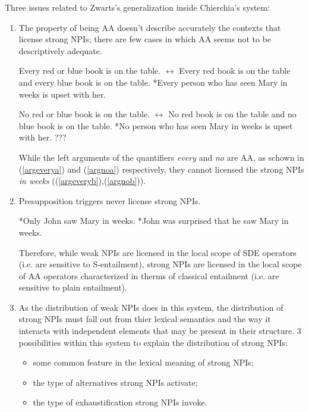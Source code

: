 \documentclass[a4paper,11pt]{article}
\newcommand{\reff}[1]{(\ref{#1})}
\begin{document}
Three issues related to Zwarts's generalization inside Chierchia's system:
\begin{enumerate}
\item The property of being AA doesn't describe accurately the contexts that license strong NPIs; there are few cases in which AA seems not to be descriptively adequate.
\begin{exe}
\ex\label{everyno} \begin{xlist}
\ex\label{argevery} \begin{xlist}
\ex\label{argeverya} Every red or blue book is on the table. $\leftrightarrow$ Every red book is on the table and every blue book is on the table.
\ex\label{argeveryb} *Every person who has seen Mary in weeks is upset with her.
\end{xlist}
\ex\label{argno} \begin{xlist}
\ex\label{argnoa} No red or blue book is on the table. $\leftrightarrow$ No red book is on the table and no blue book is on the table.
\ex\label{argnob} *No person who has seen Mary in weeks is upset with her. ??? 
\end{xlist}
\end{xlist}
\end{exe}
While the left arguments of the quantifiers \textit{every} and \textit{no} are AA, as schown in \reff{argeverya} and \reff{argnoa} respectively, they cannot licensed the strong NPIs \textit{in weeks} (\reff{argeveryb},\reff{argnob}).
\item Presupposition triggers never license strong NPIs.
\begin{exe}
\ex\label{presuptrig} \begin{xlist}
\ex\label{presuptriga} *Only John saw Mary in weeks. 
\ex\label{presuptrigb} *John was surprised that he saw Mary in weeks.
\end{xlist}
\end{exe}
Therefore, while weak NPIs are licensed in the local scope of SDE operators (i.e. are sensitive to S-entailment), strong NPIs are licensed in the local scope of AA operators 
characterized in therms of classical entailment (i.e. are sensitive to plain entailment).
\item As the distribution of weak NPIs does in this system, the distribution of strong NPIs must fall out from thier lexical semantics and the way it interacts with independent elements that may be present in their structure. 3 possibilities within this system to explain the distribution of strong NPIs:
\begin{itemize}
\item some common feature in the lexical meaning of strong NPIs;
\item the type of alternatives strong NPIs activate;
\item the type of exhaustification strong NPIs invoke.
\end{itemize}
\end{enumerate}
\end{document}

